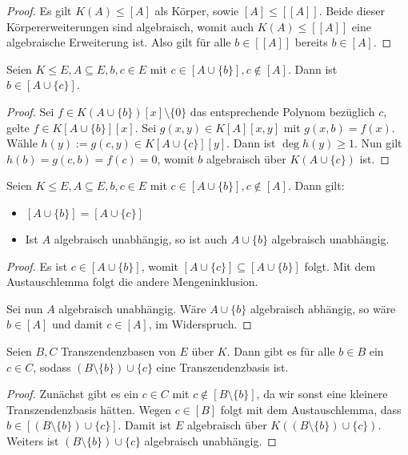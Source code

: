 \begin{proof}
    Es gilt $K(A) \leq [A]$ als Körper, sowie $[A] \leq [[A]]$. Beide dieser Körpererweiterungen sind algebraisch, womit auch $K(A) \leq [[A]]$ eine algebraische Erweiterung ist. Also gilt für alle $b \in [[A]]$ bereits $b \in [A]$.
\end{proof}

\begin{lemma}[Austauschlemma]
    Seien $K \leq E, A \subseteq E, b, c \in E$ mit $c \in [A \cup \{b\}], c \notin [A]$. Dann ist $b \in [A \cup \{c\}]$.
\end{lemma}

\begin{proof}
    Sei $f \in K(A \cup \{b\})[x] \setminus \{0\}$ das entsprechende Polynom bezüglich $c$, \obda gelte $f \in K[A \cup \{b\}][x]$. Sei $g(x,y) \in K[A][x,y]$ mit $g(x,b) = f(x)$. Wähle $h(y) := g(c, y) \in K[A \cup \{c\}][y]$. Dann ist $\deg h(y) \geq 1$. Nun gilt $h(b) = g(c,b) = f(c) = 0$, womit $b$ algebraisch über $K(A \cup \{ c \})$ ist.
\end{proof}

\begin{corollary}
    Seien $K \leq E, A \subseteq E, b, c \in E$ mit $c \in [A \cup \{b\}], c \notin [A]$. Dann gilt:
    \begin{itemize}
        \item $[A \cup \{b\}] = [A \cup \{c\}]$
        \item Ist $A$ algebraisch unabhängig, so ist auch $A \cup \{ b \}$ algebraisch unabhängig.
    \end{itemize}
\end{corollary}

\begin{proof}
    Es ist $c \in [A \cup \{b\}]$, womit $[A \cup \{c\}] \subseteq [A \cup \{b\}]$ folgt. Mit dem Austauschlemma folgt die andere Mengeninklusion.

    Sei nun $A$ algebraisch unabhängig. Wäre $A \cup \{ b \}$ algebraisch abhängig, so wäre $b \in [A]$ und damit $c \in [A]$, im Widerspruch.
\end{proof}

\begin{corollary}
    Seien $B, C$ Transzendenzbasen von $E$ über $K$. Dann gibt es für alle $b \in B$ ein $c \in C$, sodass $(B \setminus \{b\}) \cup \{c\}$ eine Transzendenzbasis ist.
\end{corollary}

\begin{proof}
    Zunächst gibt es ein $c \in C$ mit $c \notin [B \setminus \{b\}]$, da wir sonst eine kleinere Transzendenzbasis hätten. Wegen $c \in [B]$ folgt mit dem Austauschlemma, dass $b \in [(B \setminus \{b\}) \cup \{c\}]$. Damit ist $E$ algebraisch über $K((B \setminus \{b\}) \cup \{c\})$. Weiters ist $(B \setminus \{b\}) \cup \{c\}$ algebraisch unabhängig.
\end{proof}

